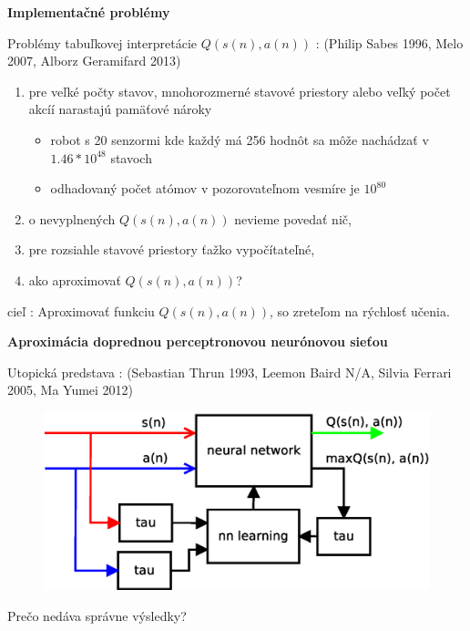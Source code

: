 \documentclass[xcolor=dvipsnames]{beamer}
\begin{document}
\begin{frame}{\bf Implementačné problémy}

Problémy tabuľkovej interpretácie $Q(s(n), a(n))$ :
(Philip Sabes 1996, Melo 2007, Alborz Geramifard 2013)
\begin{enumerate}
\item pre veľké počty stavov, mnohorozmerné stavové priestory alebo veľký počet akcíí narastajú pamäťové nároky
  \begin{itemize}
  \item robot s 20 senzormi kde každý má 256 hodnôt sa môže nachádzať v $1.46*10^{48}$ stavoch
  \item odhadovaný počet atómov v pozorovateľnom vesmíre je $10^{80}$
  \end{itemize}
\item o nevyplnených $Q(s(n), a(n))$ nevieme povedať nič,
\item pre rozsiahle stavové priestory ťažko vypočítateľné,
\item ako aproximovať $Q(s(n), a(n))$?
\end{enumerate}
\bigskip
cieľ : {\color{red} Aproximovať funkciu $Q(s(n), a(n))$}, so zreteľom
na rýchlosť učenia.
\end{frame}


\begin{frame}{\bf Aproximácia doprednou perceptronovou neurónovou sieťou}

Utopická predstava :
(Sebastian Thrun 1993, Leemon Baird N/A, Silvia Ferrari 2005, Ma Yumei 2012)

\begin{figure}[!htb]
\includegraphics[scale=.5]{../diagrams/q_learning_nn.eps}
\end{figure}

Prečo nedáva správne výsledky?
\end{frame}
\end{document}
